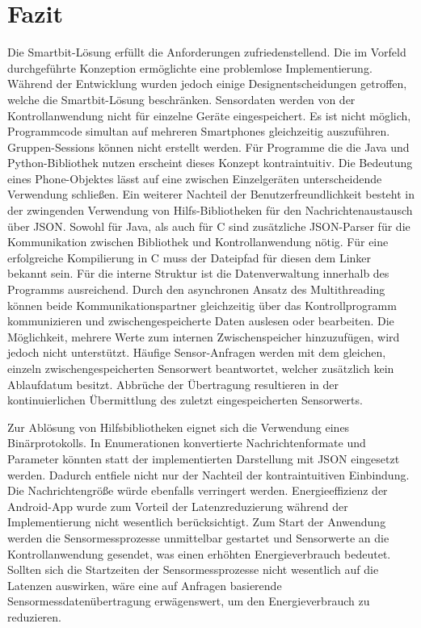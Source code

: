 \documentclass[11pt,a4paper]{report}
\begin{document}
\chapter{Fazit}\label{chap:fazit}
Die Smartbit-Lösung erfüllt die Anforderungen zufriedenstellend.
Die im Vorfeld durchgeführte Konzeption ermöglichte eine problemlose Implementierung.
Während der Entwicklung wurden jedoch einige Designentscheidungen getroffen, welche die Smartbit-Lösung beschränken.
Sensordaten werden von der Kontrollanwendung nicht für einzelne Geräte eingespeichert.
Es ist nicht möglich, Programmcode simultan auf mehreren Smartphones gleichzeitig auszuführen.
Gruppen-Sessions können nicht erstellt werden.
Für Programme die die Java und Python-Bibliothek nutzen erscheint dieses Konzept kontraintuitiv.
Die Bedeutung eines Phone-Objektes lässt auf eine zwischen Einzelgeräten unterscheidende Verwendung schließen.
Ein weiterer Nachteil der Benutzerfreundlichkeit besteht in der zwingenden Verwendung von Hilfs-Bibliotheken für den Nachrichtenaustausch über JSON.
Sowohl für Java, als auch für C sind zusätzliche JSON-Parser für die Kommunikation zwischen Bibliothek und Kontrollanwendung nötig.
Für eine erfolgreiche Kompilierung in C muss der Dateipfad für diesen dem Linker bekannt sein.
Für die interne Struktur ist die Datenverwaltung innerhalb des Programms ausreichend.
Durch den asynchronen Ansatz des Multithreading können beide Kommunikationspartner gleichzeitig über das Kontrollprogramm kommunizieren und zwischengespeicherte Daten auslesen oder bearbeiten.
Die Möglichkeit, mehrere Werte zum internen Zwischenspeicher hinzuzufügen, wird jedoch nicht unterstützt.
Häufige Sensor-Anfragen werden mit dem gleichen, einzeln zwischengespeicherten Sensorwert beantwortet, welcher zusätzlich kein Ablaufdatum besitzt.
Abbrüche der Übertragung resultieren in der kontinuierlichen Übermittlung des zuletzt eingespeicherten Sensorwerts.

Zur Ablösung von Hilfsbibliotheken eignet sich die Verwendung eines Binärprotokolls.
In Enumerationen konvertierte Nachrichtenformate und Parameter könnten statt der implementierten Darstellung mit JSON eingesetzt werden.
Dadurch entfiele nicht nur der Nachteil der kontraintuitiven Einbindung.
Die Nachrichtengröße würde ebenfalls verringert werden.
Energieeffizienz der Android-App wurde zum Vorteil der Latenzreduzierung während der Implementierung nicht wesentlich berücksichtigt.
Zum Start der Anwendung werden die Sensormessprozesse unmittelbar gestartet und Sensorwerte an die Kontrollanwendung gesendet, was einen erhöhten Energieverbrauch bedeutet.
Sollten sich die Startzeiten der Sensormessprozesse nicht wesentlich auf die Latenzen auswirken, wäre eine auf Anfragen basierende Sensormessdatenübertragung erwägenswert, um den Energieverbrauch zu reduzieren.
\end{document}
